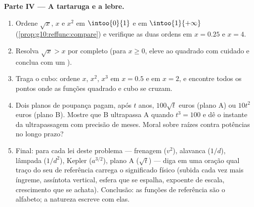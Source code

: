 \begin{problem}
\medskip
\noindent\textbf{Parte IV --- A tartaruga e a lebre.}
\begin{enumerate}[resume]
  \item Ordene $\sqrt x$, $x$ e $x^2$ em $\intoo{0}{1}$ e em
        $\intoo{1}{+\infty}$
        (\cref{prop:g10:reffunc:compare}) e verifique as duas
        ordens em $x = 0.25$ e $x = 4$.
  \item Resolva $\sqrt x > x$ por completo (para $x \geq 0$,
        eleve ao quadrado com cuidado e conclua com um ).
  \item Traga o cubo: ordene $x$, $x^2$, $x^3$ em $x = 0.5$ e em
        $x = 2$, e encontre todos os pontos onde as funções
        quadrado e cubo se cruzam.
  \item Dois planos de poupança pagam, após $t$ anos,
        $100\sqrt t$ euros (plano A) ou $10 t^2$ euros (plano B).
        Mostre que B ultrapassa A quando $t^3 = 100$ e dê o
        instante da ultrapassagem com precisão de meses. Moral
        sobre raízes contra potências no longo prazo?
  \item Final: para cada lei deste problema --- frenagem
        ($v^2$), alavanca ($1/d$), lâmpada ($1/d^2$), Kepler
        ($a^{3/2}$), plano A ($\sqrt t$) --- diga em uma oração
        qual traço do seu  de referência carrega o
        significado físico (subida cada vez mais íngreme,
        assíntota vertical, esfera que se espalha, expoente de
        escala, crescimento que se achata). Conclusão: as funções
        de referência são o alfabeto; a natureza escreve com
        elas.
\end{enumerate}
\end{problem}
